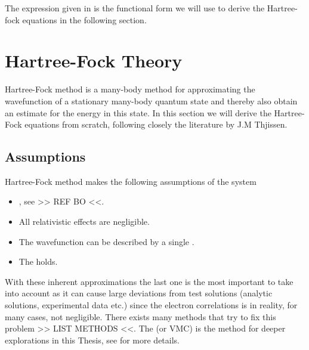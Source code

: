     The expression given in  is the functional form we will
    use to derive the Hartree-fock equations in the following section.

\section{Hartree-Fock Theory\label{sec:HFtheory}}
    Hartree-Fock method is a many-body method for approximating the
    wavefunction of a stationary many-body quantum state and thereby also
    obtain an estimate for the energy in this state. In this section we will
    derive the Hartree-Fock equations from scratch, following closely the
    literature by J.M Thjissen\cite{compphysThijssen}. 

    \subsection{Assumptions}
        Hartree-Fock method makes the following assumptions of the system
            \begin{itemize}
                \item {}, see >> REF BO <<.
                \item All relativistic effects are negligible.
                \item The wavefunction can be described by a single
                    .
                \item The  holds.
            \end{itemize}
        With these inherent approximations the last one is the most important
        to take into account as it can cause large deviations from test
        solutions (analytic solutions, experimental data etc.) since the
        electron correlations is in reality, for many cases, not negligible.
        There exists many methods that try to fix this problem >> LIST METHODS
        <<. The  (or VMC) is the method for
        deeper explorations in this Thesis, see  for more details.

